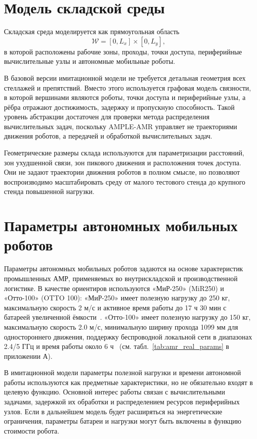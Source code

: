 \section{Модель складской среды}

Складская среда моделируется как прямоугольная область
\[
\mathcal{W} = [0, L_x] \times [0, L_y],
\]
в которой расположены рабочие зоны, проходы, точки доступа, периферийные вычислительные узлы и автономные мобильные роботы.

В базовой версии имитационной модели не требуется детальная геометрия всех стеллажей и препятствий. Вместо этого используется графовая модель связности, в которой вершинами являются роботы, точки доступа и периферийные узлы, а рёбра отражают достижимость, задержку и пропускную способность. Такой уровень абстракции достаточен для проверки метода распределения вычислительных задач, поскольку AMPLE-AMR управляет не траекториями движения роботов, а передачей и обработкой вычислительных задач.

Геометрические размеры склада используются для параметризации расстояний, зон ухудшенной связи, зон пикового движения и расположения точек доступа. Они не задают траектории движения роботов в полном смысле, но позволяют воспроизводимо масштабировать среду от малого тестового стенда до крупного стенда повышенной нагрузки.

\section{Параметры автономных мобильных роботов}

Параметры автономных мобильных роботов задаются на основе характеристик промышленных АМР, применяемых во внутрискладской и производственной логистике. В качестве ориентиров используются «МиР-250» (MiR250) и «Отто-100» (OTTO 100): «МиР-250» имеет полезную нагрузку до 250 кг, максимальную скорость 2 м/с и активное время работы до 17 ч 30 мин с батареей увеличенной ёмкости~\cite{MiR250Spec2026}. «Отто-100» имеет полезную нагрузку до 150 кг, максимальную скорость 2.0 м/с, минимальную ширину прохода 1099 мм для одностороннего движения, поддержку беспроводной локальной сети в диапазонах 2.4/5 ГГц и время работы около 6 ч~\cite{OTTO100Spec2026} (см. табл.~\ref{tab:amr_real_params} в приложении А).

В имитационной модели параметры полезной нагрузки и времени автономной работы используются как предметные характеристики, но не обязательно входят в целевую функцию. Основной интерес работы связан с вычислительными задачами, задержкой их обработки и распределением ресурсов периферийных узлов. Если в дальнейшем модель будет расширяться на энергетические ограничения, параметры батареи и нагрузки могут быть включены в функцию стоимости робота.

